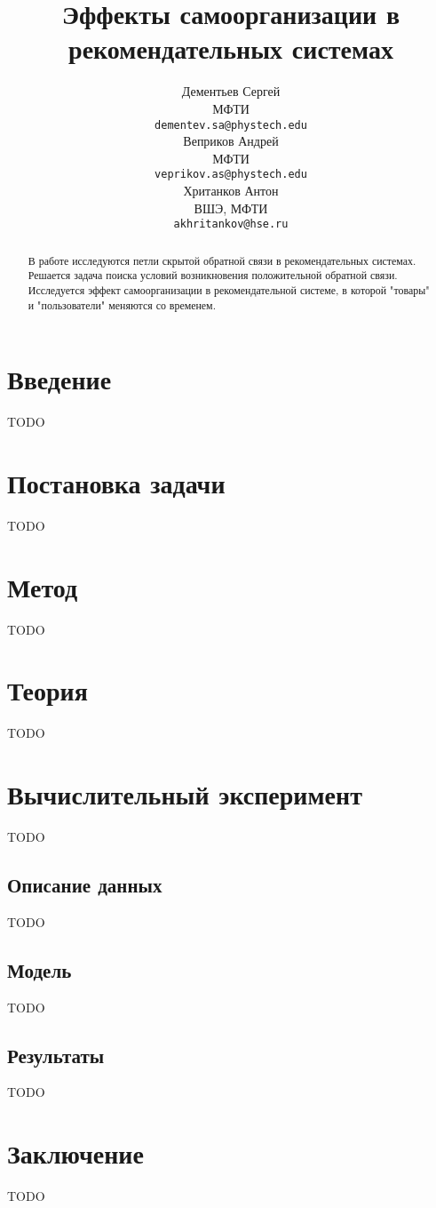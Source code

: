 \documentclass{article}
\title{Эффекты самоорганизации в рекомендательных системах}
\author{ Дементьев Сергей \\
        МФТИ\\
	\texttt{dementev.sa@phystech.edu}  \\
	\And
	Веприков Андрей \\
        МФТИ \\
	\texttt{veprikov.as@phystech.edu}  \\
	\And
    Хританков Антон \\
    ВШЭ, МФТИ\\
     \texttt{akhritankov@hse.ru} \\
}
\date{}
\begin{document}
\maketitle

\begin{abstract}
    В работе исследуются петли скрытой обратной связи в рекомендательных системах.
    Решается задача поиска условий возникновения положительной обратной связи. Исследуется эффект самоорганизации в рекомендательной системе, в которой "товары" и "пользователи" меняются со временем.

\end{abstract}


\section{Введение}
TODO

\section{Постановка задачи}

TODO

\section{Метод}

TODO

\section{Теория}

TODO


\section{Вычислительный эксперимент}

TODO

\subsection{Описание данных}

TODO


\subsection{Модель}

TODO


\subsection{Результаты}
TODO

\section{Заключение}

TODO



\end{document}
